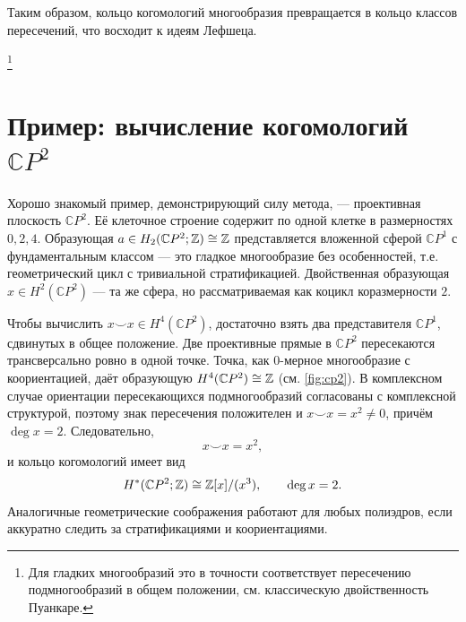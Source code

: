 \documentclass[12pt]{article}
\begin{document}
Таким образом, кольцо когомологий многообразия превращается в кольцо классов пересечений, что восходит к идеям Лефшеца.\addtocounter{footnote}{1}\footnote{Для гладких многообразий это в точности соответствует пересечению подмногообразий в общем положении, см. классическую двойственность Пуанкаре.}

\section[Пример: вычисление когомологий $\mathbb{C}P^2$]{Пример: вычисление когомологий $\mathbb{C}P^2$}

Хорошо знакомый пример, демонстрирующий силу метода, --- проективная плоскость $\mathbb{C}P^2$. Её клеточное строение содержит по одной клетке в размерностях $0,2,4$. Образующая $a \in H_2(\mathbb{C}P^2;\mathbb Z) \cong \mathbb Z$ представляется вложенной сферой $\mathbb{C}P^1$ с фундаментальным классом --- это гладкое многообразие без особенностей, т.е. геометрический цикл с тривиальной стратификацией. Двойственная образующая $x \in H^2(\mathbb{C}P^2)$ --- та же сфера, но рассматриваемая как коцикл коразмерности $2$.

Чтобы вычислить $x \smile x \in H^4(\mathbb{C}P^2)$, достаточно взять два представителя $\mathbb{C}P^1$, сдвинутых в общее положение. Две проективные прямые в $\mathbb{C}P^2$ пересекаются трансверсально ровно в одной точке. Точка, как $0$-мерное многообразие с коориентацией, даёт образующую $H^4(\mathbb{C}P^2) \cong \mathbb Z$ (см. \cref{fig:cp2}). В комплексном случае ориентации пересекающихся подмногообразий согласованы с комплексной структурой, поэтому знак пересечения положителен и $x \smile x = x^2 \neq 0$, причём $\deg x = 2$. Следовательно,
\begin{equation}
x \smile x = x^2,
\end{equation}
и кольцо когомологий имеет вид
\begin{equation}
H^*(\mathbb{C}P^2;\mathbb Z) \cong \mathbb Z[x]/(x^3), \qquad \deg x = 2.
\end{equation}
Аналогичные геометрические соображения работают для любых полиэдров, если аккуратно следить за стратификациями и коориентациями.\footnotemark
{}
\end{document}
